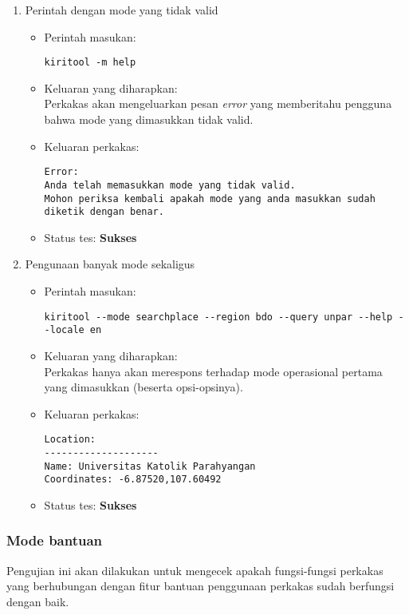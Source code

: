 \begin{enumerate}
	\item Perintah dengan mode yang tidak valid
	\begin{itemize}
		\item Perintah masukan:
		\begin{lstlisting}
kiritool -m help
		\end{lstlisting}
		\item Keluaran yang diharapkan: \\
		Perkakas akan mengeluarkan pesan \textit{error} yang memberitahu pengguna bahwa mode yang dimasukkan tidak valid.
		\item Keluaran perkakas:
		\begin{lstlisting}
Error:
Anda telah memasukkan mode yang tidak valid.
Mohon periksa kembali apakah mode yang anda masukkan sudah diketik dengan benar.
		\end{lstlisting}
		\item Status tes: \textbf{Sukses}
	\end{itemize}
	
	\item Pengunaan banyak mode sekaligus
	\begin{itemize}
		\item Perintah masukan:
		\begin{lstlisting}
kiritool --mode searchplace --region bdo --query unpar --help --locale en
		\end{lstlisting}
		\item Keluaran yang diharapkan: \\
		Perkakas hanya akan merespons terhadap mode operasional pertama yang dimasukkan (beserta opsi-opsinya).
		\item Keluaran perkakas:
		\begin{lstlisting}
Location:
--------------------
Name: Universitas Katolik Parahyangan
Coordinates: -6.87520,107.60492
		\end{lstlisting}
		\item Status tes: \textbf{Sukses}
	\end{itemize}

\end{enumerate}

\subsubsection{Mode bantuan}
\label{sec:testing-experiments-testing-help}

Pengujian ini akan dilakukan untuk mengecek apakah fungsi-fungsi perkakas yang berhubungan dengan fitur bantuan penggunaan perkakas sudah berfungsi dengan baik.

